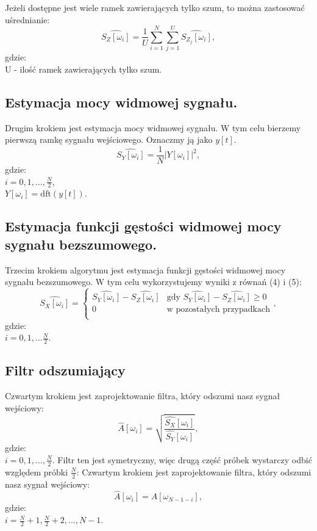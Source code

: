 \documentclass[11pt,a4paper,twoside]{article}
\begin{document}
Jeżeli dostępne jest wiele ramek zawierających tylko szum, to można zastosować uśrednianie:
\begin{equation}
	\widehat{S_{Z}[\omega_{i}]} = \frac{1}{U}\sum_{i=1}^{N}\sum_{j=1}^{U} \widehat{S_{Z_{j}}[\omega_{i}]},
\end{equation} gdzie: \\
U - ilość ramek zawierających tylko szum.


\subsection{Estymacja mocy widmowej sygnału.}
Drugim krokiem jest estymacja mocy widmowej sygnału. W tym celu bierzemy pierwszą ramkę sygnału wejściowego. Oznaczmy ją jako $y[t]$. 
\begin{equation}
	\widehat{S_{Y}[\omega_{i}]} = \frac{1}{N}|Y[\omega_{i}]|^2,
\end{equation} gdzie: \\
$i = 0,1,...,\frac{N}{2}$, \\
$Y[\omega_{i}] = \mathrm{dft}(y[t])$.

\subsection{Estymacja funkcji gęstości widmowej mocy sygnału bezszumowego.}
Trzecim krokiem algorytmu jest estymacja funkcji gęstości widmowej mocy sygnału bezszumowego. W tym celu wykorzystujemy wyniki z równań (4) i (5):
\begin{equation}
	\widehat{S_{X}[\omega_{i}]} = 
	\left\{ \begin{array}{ll}
		\widehat{S_{Y}[\omega_{i}]}-\widehat{S_{Z}[\omega_{i}]} & 
		\textrm{gdy $\widehat{S_{Y}[\omega_{i}]}-\widehat{S_{Z}[\omega_{i}]}\geq 0$}\\
		 0 & \textrm{w pozostałych przypadkach}\\
	\end{array}\right.,
\end{equation} gdzie: \\
$i = 0,1,...\frac{N}{2}$.

\subsection{Filtr odszumiający}
Czwartym krokiem jest zaprojektowanie filtra, który odszumi nasz sygnał wejściowy: 
\begin{equation}
		\widehat{A}[\omega_{i}] = \sqrt{\frac{\widehat{S_{X}}[\omega_{i}] }{\widehat{S_{Y}}[\omega_{i}]}},
\end{equation} gdzie: \\
$i = 0,1,...,\frac{N}{2}$.
Filtr ten jest symetryczny, więc drugą część próbek wystarczy odbić względem próbki $\frac{N}{2}$:
Czwartym krokiem jest zaprojektowanie filtra, który odszumi nasz sygnał wejściowy: 
\begin{equation}
	\widehat{A}[\omega_{i}] = 	\widehat{A}[\omega_{N-1-i}],
\end{equation} gdzie: \\
$i = \frac{N}{2}+1, \frac{N}{2}+2,...,N-1$.
\end{document}
